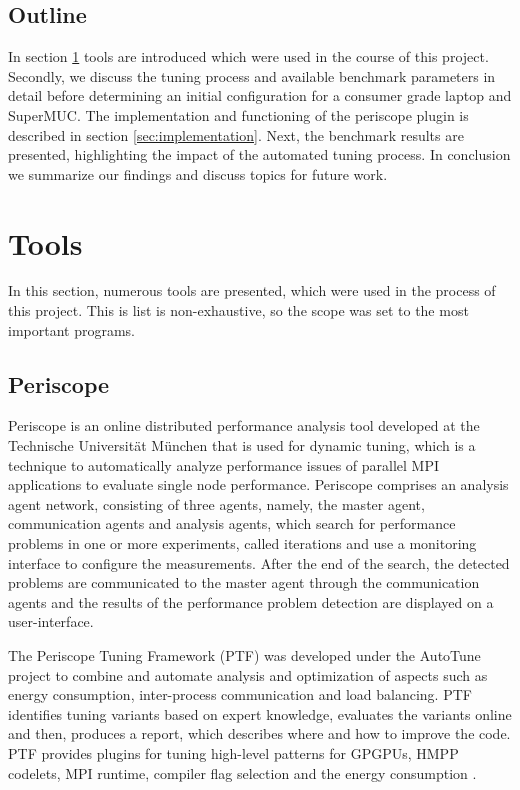 \documentclass[10pt,twocolumn]{article}
\begin{document}
\subsection{Outline}
In section \ref{sec:tools} tools are introduced which were used in the course of this project. Secondly, we discuss the tuning process and available benchmark parameters in detail before determining an initial configuration for a consumer grade laptop and SuperMUC. The implementation and functioning of the periscope plugin is described in section \ref{sec:implementation}. Next, the benchmark results are presented, highlighting the impact of the automated tuning process. In conclusion we summarize our findings and discuss topics for future work.

\section{Tools}
\label{sec:tools}

In this section, numerous tools are presented, which were used in the process of this project. This is list is non-exhaustive, so the scope was set to the most important programs.

\subsection{Periscope}
Periscope is an online distributed performance analysis tool\cite{tibidabo} developed at the Technische Universit\"at M\"unchen that is used for dynamic tuning, which is a technique to automatically analyze performance issues of parallel MPI applications to evaluate single node performance\cite{tibidabo}. Periscope comprises an analysis agent network, consisting of three agents, namely, the master agent, communication agents and analysis agents, which search for performance problems in one or more experiments, called iterations and use a monitoring interface to conﬁgure the measurements. After the end of the search, the detected problems are communicated to the master agent through the communication agents and the results of the performance problem detection are displayed on a user-interface.


The Periscope Tuning Framework (PTF) was developed under the AutoTune project \cite{apsc} to combine and automate analysis and optimization of aspects such as energy consumption, inter-process communication and load balancing. PTF identiﬁes tuning variants based on expert knowledge, evaluates the variants online and then, produces a report, which describes where and how to improve the code. PTF provides plugins for tuning high-level patterns for GPGPUs, HMPP codelets, MPI runtime, compiler flag selection and the energy consumption \cite{apsc}. 
\end{document}
